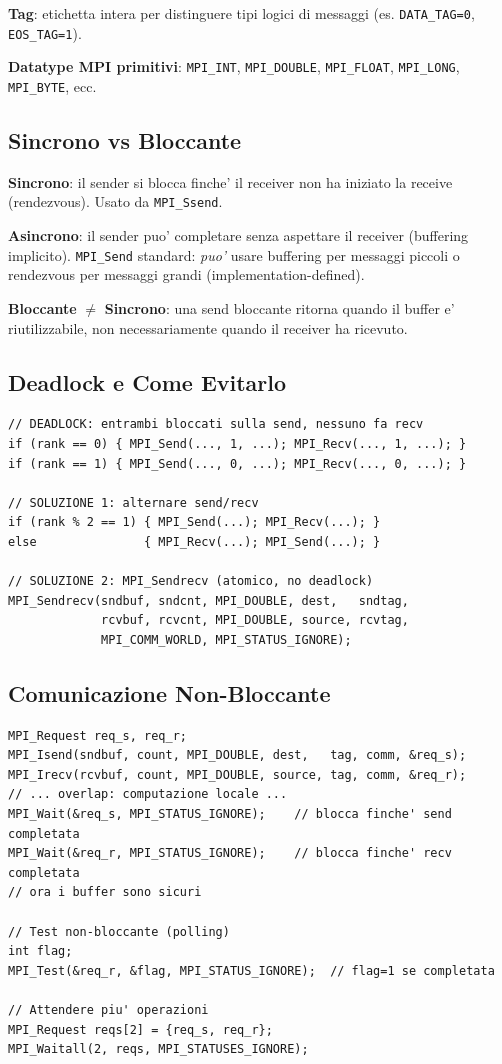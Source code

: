 \documentclass[11pt,a4paper]{article}
\theoremstyle{remark}
\begin{document}
\textbf{Tag}: etichetta intera per distinguere tipi logici di messaggi (es. \lstinline|DATA_TAG=0|, \lstinline|EOS_TAG=1|).

\textbf{Datatype MPI primitivi}: \lstinline|MPI_INT|, \lstinline|MPI_DOUBLE|, \lstinline|MPI_FLOAT|, \lstinline|MPI_LONG|, \lstinline|MPI_BYTE|, ecc.

\subsection{Sincrono vs Bloccante}

\textbf{Sincrono}: il sender si blocca finche' il receiver non ha iniziato la receive (rendezvous). Usato da \lstinline|MPI_Ssend|.

\textbf{Asincrono}: il sender puo' completare senza aspettare il receiver (buffering implicito). \lstinline|MPI_Send| standard: \emph{puo'} usare buffering per messaggi piccoli o rendezvous per messaggi grandi (implementation-defined).

\textbf{Bloccante} $\neq$ \textbf{Sincrono}: una send bloccante ritorna quando il buffer e' riutilizzabile, non necessariamente quando il receiver ha ricevuto.

\subsection{Deadlock e Come Evitarlo}

\begin{lstlisting}[style=cpp]
// DEADLOCK: entrambi bloccati sulla send, nessuno fa recv
if (rank == 0) { MPI_Send(..., 1, ...); MPI_Recv(..., 1, ...); }
if (rank == 1) { MPI_Send(..., 0, ...); MPI_Recv(..., 0, ...); }

// SOLUZIONE 1: alternare send/recv
if (rank % 2 == 1) { MPI_Send(...); MPI_Recv(...); }
else               { MPI_Recv(...); MPI_Send(...); }

// SOLUZIONE 2: MPI_Sendrecv (atomico, no deadlock)
MPI_Sendrecv(sndbuf, sndcnt, MPI_DOUBLE, dest,   sndtag,
             rcvbuf, rcvcnt, MPI_DOUBLE, source, rcvtag,
             MPI_COMM_WORLD, MPI_STATUS_IGNORE);
\end{lstlisting}

\subsection{Comunicazione Non-Bloccante}

\begin{lstlisting}[style=cpp]
MPI_Request req_s, req_r;
MPI_Isend(sndbuf, count, MPI_DOUBLE, dest,   tag, comm, &req_s);
MPI_Irecv(rcvbuf, count, MPI_DOUBLE, source, tag, comm, &req_r);
// ... overlap: computazione locale ...
MPI_Wait(&req_s, MPI_STATUS_IGNORE);    // blocca finche' send completata
MPI_Wait(&req_r, MPI_STATUS_IGNORE);    // blocca finche' recv completata
// ora i buffer sono sicuri

// Test non-bloccante (polling)
int flag;
MPI_Test(&req_r, &flag, MPI_STATUS_IGNORE);  // flag=1 se completata

// Attendere piu' operazioni
MPI_Request reqs[2] = {req_s, req_r};
MPI_Waitall(2, reqs, MPI_STATUSES_IGNORE);
\end{lstlisting}
\end{document}
